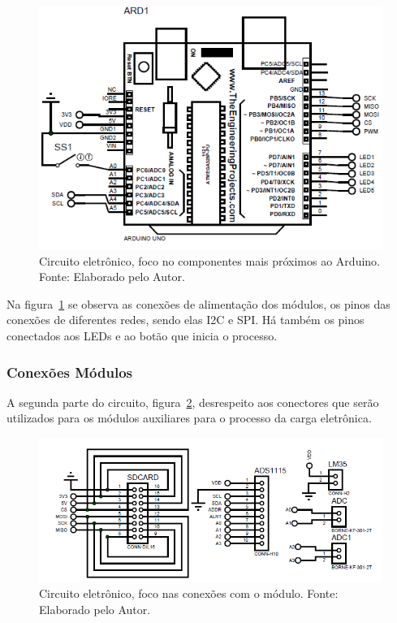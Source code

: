 \begin{figure}[!htbp]
	\centering
	\includegraphics[scale=1.0]{imagens/CircuitoArduino.png}
	\caption{Circuito eletrônico, foco no componentes mais próximos ao Arduino. Fonte: Elaborado pelo Autor. 	}
	\label{fig:CircuitoArduino}
\end{figure}
\FloatBarrier

Na figura~\ref{fig:CircuitoArduino} se observa as conexões de alimentação dos módulos, os pinos das conexões de diferentes redes, sendo elas I2C e SPI. Há também os pinos conectados aos LEDs e ao botão que inicia o processo.

\subsubsection{Conexões Módulos}

A segunda parte do circuito,  figura~\ref{fig:CircuitoMod}, desrespeito aos conectores que serão utilizados para os módulos auxiliares para o processo da carga eletrônica.

\begin{figure}[!htbp]
	\centering
	\includegraphics[scale=0.7]{imagens/CircuitoMod.png}
	\caption{Circuito eletrônico, foco nas conexões com o módulo. Fonte: Elaborado pelo Autor. 	}
	\label{fig:CircuitoMod}
\end{figure}
\FloatBarrier

